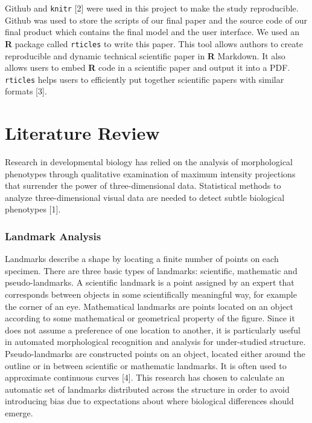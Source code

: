 \documentclass[10pt,letterpaper]{article}
\begin{document}
Github and \texttt{knitr} {[}2{]} were used in this project to make the
study reproducible. Github was used to store the scripts of our final
paper and the source code of our final product which contains the final
model and the user interface. We used an \textbf{R} package called
\texttt{rticles} to write this paper. This tool allows authors to create
reproducible and dynamic technical scientific paper in \textbf{R}
Markdown. It also allows users to embed \textbf{R} code in a scientific
paper and output it into a PDF. \texttt{rticles} helps users to
efficiently put together scientific papers with similar formats {[}3{]}.

\section{Literature Review}\label{literature-review}

Research in developmental biology has relied on the analysis of
morphological phenotypes through qualitative examination of maximum
intensity projections that surrender the power of three-dimensional
data. Statistical methods to analyze three-dimensional visual data are
needed to detect subtle biological phenotypes {[}1{]}.

\subsubsection{Landmark Analysis}\label{landmark-analysis}

Landmarks describe a shape by locating a finite number of points on each
specimen. There are three basic types of landmarks: scientific,
mathematic and pseudo-landmarks. A scientific landmark is a point
assigned by an expert that corresponds between objects in some
scientifically meaningful way, for example the corner of an eye.
Mathematical landmarks are points located on an object according to some
mathematical or geometrical property of the figure. Since it does not
assume a preference of one location to another, it is particularly
useful in automated morphological recognition and analysis for
under-studied structure. Pseudo-landmarks are constructed points on an
object, located either around the outline or in between scientific or
mathematic landmarks. It is often used to approximate continuous curves
{[}4{]}. This research has chosen to calculate an automatic set of
landmarks distributed across the structure in order to avoid introducing
bias due to expectations about where biological differences should
emerge.
\end{document}
